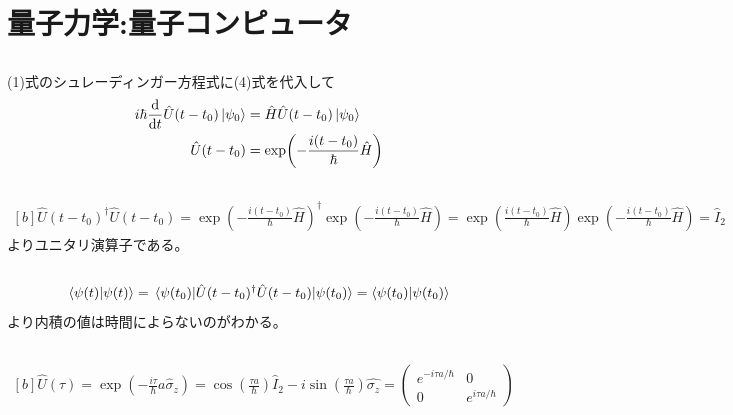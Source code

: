 \documentclass[../ap_2021.tex]{subfiles}
\begin{document}
\setcounter{chapter}{0}
\chapter{量子力学:量子コンピュータ}
\section{}
(1)式のシュレーディンガー方程式に(4)式を代入して
\begin{equation}\begin{aligned}[b]
    i\hbar\dv{t}\hat{U}(t-t_0)\ket{\psi_0}&=\hat{H}\hat{U}(t-t_0)\ket{\psi_0}\\
    \hat{U}(t-t_0) &= \exp(-\frac{i(t-t_0)}{\hbar}\hat{H})
\end{aligned}\end{equation}

\section{}
\begin{equation}\begin{aligned}[b]
    \hat{U}(t-t_0)^\dagger \hat{U}(t-t_0)
    =\exp(-\frac{i(t-t_0)}{\hbar}\hat{H})^\dagger\exp(-\frac{i(t-t_0)}{\hbar}\hat{H})
    =\exp(\frac{i(t-t_0)}{\hbar}\hat{H})\exp(-\frac{i(t-t_0)}{\hbar}\hat{H})
    =\hat{I}_2
\end{aligned}\end{equation}
よりユニタリ演算子である。

\section{}
\begin{equation}\begin{aligned}[b]
    \braket{\psi(t)}=\mel{\psi(t_0)}{\hat{U}(t-t_0)^\dagger \hat{U}(t-t_0)}{\psi(t_0)}=\braket{\psi(t_0)}
\end{aligned}\end{equation}
より内積の値は時間によらないのがわかる。

\section{}
\begin{equation}\begin{aligned}[b]
    \hat{U}(\tau)=\exp(-\frac{i\tau}{\hbar}a\hat{\sigma}_z)
    =\cos(\frac{\tau a}{\hbar})\hat{I}_2-i\sin(\frac{\tau a}{\hbar})\hat{\sigma_z}
    =\begin{pmatrix}
        e^{-i\tau a/\hbar} & 0\\
        0 & e^{i\tau a/\hbar}
    \end{pmatrix}
\end{aligned}\end{equation}
\end{document}
